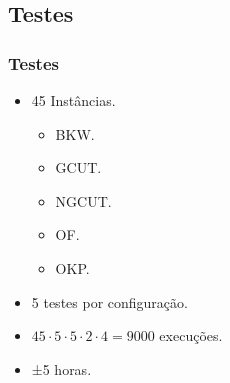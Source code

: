\subsection{Testes}\label{subsec:testes}
\begin{frame}
    \frametitle{Testes}
    \begin{itemize}
        \item 45 Instâncias.
        \begin{itemize}
            \item BKW\@.
            \item GCUT\@.
            \item NGCUT\@.
            \item OF\@.
            \item OKP\@.
        \end{itemize}
        \item 5 testes por configuração.
        \item $45 \cdot 5 \cdot 5 \cdot 2 \cdot 4 = 9000$ execuções.
        \item ±5 horas.
    \end{itemize}
\end{frame}